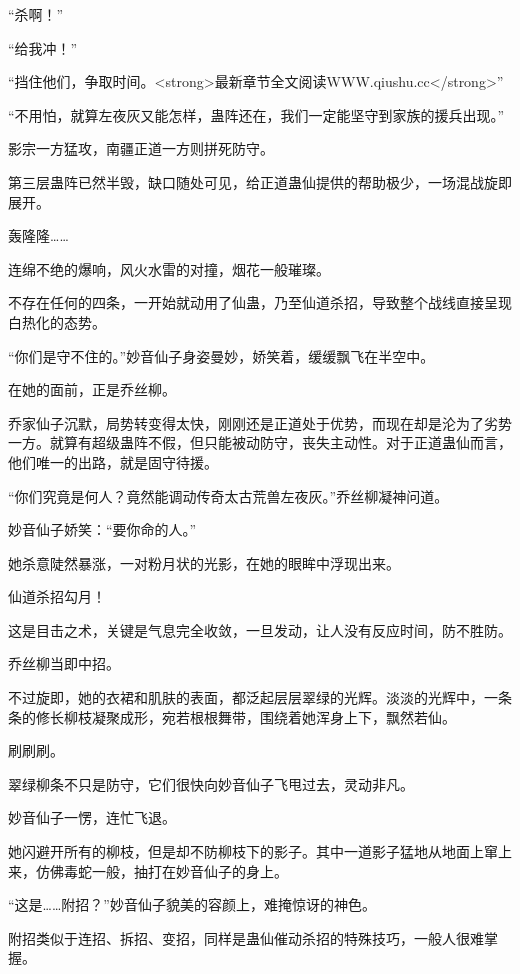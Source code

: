 
\begin{this_body}

“杀啊！”

“给我冲！”

“挡住他们，争取时间。<strong>最新章节全文阅读WWW.qiushu.cc</strong>”

“不用怕，就算左夜灰又能怎样，蛊阵还在，我们一定能坚守到家族的援兵出现。”

影宗一方猛攻，南疆正道一方则拼死防守。

第三层蛊阵已然半毁，缺口随处可见，给正道蛊仙提供的帮助极少，一场混战旋即展开。

轰隆隆……

连绵不绝的爆响，风火水雷的对撞，烟花一般璀璨。

不存在任何的四条，一开始就动用了仙蛊，乃至仙道杀招，导致整个战线直接呈现白热化的态势。

“你们是守不住的。”妙音仙子身姿曼妙，娇笑着，缓缓飘飞在半空中。

在她的面前，正是乔丝柳。

乔家仙子沉默，局势转变得太快，刚刚还是正道处于优势，而现在却是沦为了劣势一方。就算有超级蛊阵不假，但只能被动防守，丧失主动性。对于正道蛊仙而言，他们唯一的出路，就是固守待援。

“你们究竟是何人？竟然能调动传奇太古荒兽左夜灰。”乔丝柳凝神问道。

妙音仙子娇笑：“要你命的人。”

她杀意陡然暴涨，一对粉月状的光影，在她的眼眸中浮现出来。

仙道杀招勾月！

这是目击之术，关键是气息完全收敛，一旦发动，让人没有反应时间，防不胜防。

乔丝柳当即中招。

不过旋即，她的衣裙和肌肤的表面，都泛起层层翠绿的光辉。淡淡的光辉中，一条条的修长柳枝凝聚成形，宛若根根舞带，围绕着她浑身上下，飘然若仙。

刷刷刷。

翠绿柳条不只是防守，它们很快向妙音仙子飞甩过去，灵动非凡。

妙音仙子一愣，连忙飞退。

她闪避开所有的柳枝，但是却不防柳枝下的影子。其中一道影子猛地从地面上窜上来，仿佛毒蛇一般，抽打在妙音仙子的身上。

“这是……附招？”妙音仙子貌美的容颜上，难掩惊讶的神色。

附招类似于连招、拆招、变招，同样是蛊仙催动杀招的特殊技巧，一般人很难掌握。


\end{this_body}
